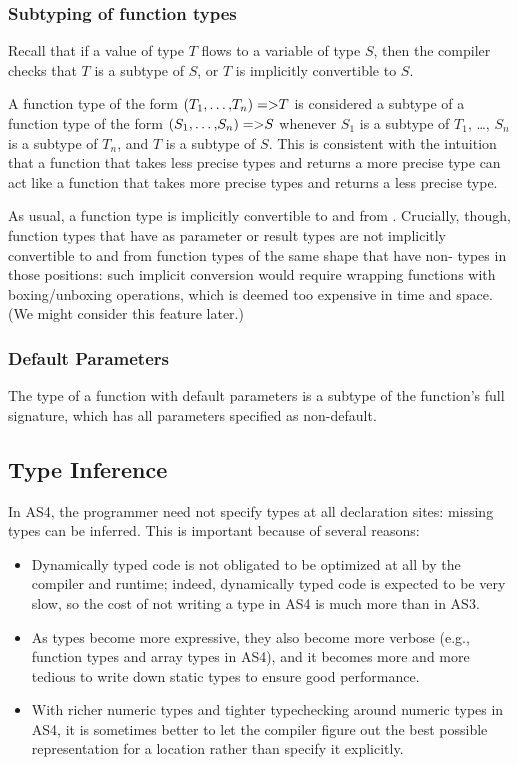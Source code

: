 \subsubsection{Subtyping of function types}

Recall that if a value of type $T$ flows to a variable of type $S$,
then the compiler checks that $T$ is a subtype of $S$, or $T$ is
implicitly convertible to $S$.

A function type of the form
${\tt (}T_1{\tt ,}\dots{\tt ,}T_n{\tt ) => } T$
is considered a subtype of a function type of the form
${\tt (}S_1{\tt ,}\dots{\tt ,}S_n{\tt ) => } S$ whenever
$S_1$ is a subtype of $T_1$, \dots, $S_n$ is a subtype of $T_n$, and
$T$ is a subtype of $S$. This is consistent with the intuition that a
function that takes less precise types and returns a more precise type
can act like a function that takes more precise types and returns a
less precise type.

As usual, a function type is implicitly convertible to and from
\code{*}. Crucially, though, function types that have \code{*} as
parameter or result types are not implicitly convertible to and from
function types of the same shape that have non-\code{*} types in those
positions: such implicit conversion would require wrapping functions
with boxing/unboxing operations, which is deemed too expensive in time
and space. (We might consider this feature later.)

\subsubsection{Default Parameters}

The type of a function with default parameters is a subtype of the function's
full signature, which has all parameters specified as non-default.

\subsection{Type Inference}

In AS4, the programmer need not specify types at all declaration
sites: missing types can be inferred. This is important because of
several reasons:

\begin{itemize}
\item Dynamically typed code is not obligated to be optimized at all by the
compiler and runtime; indeed, dynamically typed code is expected to be
very slow, so the cost of not writing a type in AS4 is
much more than in AS3.
\item As types become more expressive, they also become more verbose (e.g., function
  types and array types in AS4), and it becomes
  more and more tedious to write down static types to ensure good
  performance.
\item With richer numeric types and tighter typechecking around numeric types in AS4, it is
  sometimes better to let the compiler figure out the best possible
  representation for a location rather than specify it explicitly.
\end{itemize}

